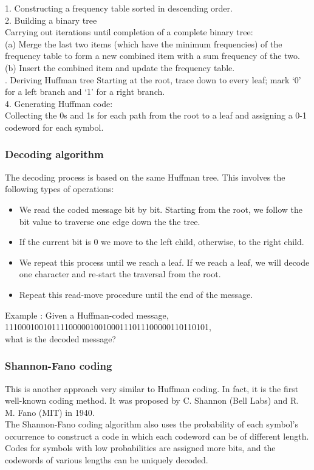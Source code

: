 \documentclass[a4]{beamer}
\begin{document}
\begin{frame}
\large
1. Constructing a frequency table sorted in descending order.\\
2. Building a binary tree\\
Carrying out iterations until completion of a complete binary tree:\\
(a) Merge the last two items (which have the minimum frequencies) of
the frequency table to form a new combined item with a sum
frequency of the two.\\
(b) Insert the combined item and update the frequency table.\\ . Deriving Huffman tree
Starting at the root, trace down to every leaf; mark ‘0’ for a left branch
and ‘1’ for a right branch.\\
4. Generating Huffman code:\\
Collecting the 0s and 1s for each path from the root to a leaf and
assigning a 0-1 codeword for each symbol.
\end{frame}
\begin{frame}
\frametitle{Decoding algorithm}
The decoding process is based on the same Huffman tree. This involves the
following types of operations:
\begin{itemize}
\item We read the coded message bit by bit. Starting from the root, we follow
the bit value to traverse one edge down the the tree.
\item If the current bit is 0 we move to the left child, otherwise, to the right
child.
\item We repeat this process until we reach a leaf. If we reach a leaf, we will
decode one character and re-start the traversal from the root.
\item Repeat this read-move procedure until the end of the message.
\end{itemize}
Example : Given a Huffman-coded message,\\
111000100101111000001001000111011100000110110101,\\
what is the decoded message?
\end{frame}
\begin{frame}
\frametitle{Shannon-Fano coding}
This is another approach very similar to Huffman coding. In fact, it is the
first well-known coding method. It was proposed by C. Shannon (Bell Labs)
and R. M. Fano (MIT) in 1940.\\
The Shannon-Fano coding algorithm also uses the probability of each
symbol’s occurrence to construct a code in which each codeword can be of
different length. \\Codes for symbols with low probabilities are assigned more
bits, and the codewords of various lengths can be uniquely decoded.
\end{frame}
\end{document}
